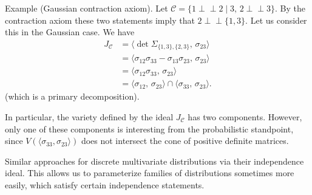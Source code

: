 Example (Gaussian contraction axiom). 
Let \(\mathcal{C} = \{ 1 \perp\!\!\!\perp 2 \mid 3,\, 2 \perp\!\!\!\perp 3 \}\). 
By the contraction axiom these two statements imply that \(2 \perp\!\!\!\perp \{ 1, 3 \}\). 
Let us consider this in the Gaussian case. We have
\[
\begin{aligned}
J_{\mathcal{C}} &= \langle \det \Sigma_{\{1,3\}, \{2,3\}},\, \sigma_{23} \rangle \\
    &= \langle \sigma_{12} \sigma_{33} - \sigma_{13} \sigma_{23},\, \sigma_{23} \rangle \\
    &= \langle \sigma_{12} \sigma_{33},\, \sigma_{23} \rangle \\
    &= \langle \sigma_{12},\, \sigma_{23} \rangle \cap \langle \sigma_{33},\, \sigma_{23} \rangle.
\end{aligned}
\]
(which is a primary decomposition).

In particular, the variety defined by the ideal \(J_{\mathcal{C}}\) has two components. 
However, only one of these components is interesting from the probabilistic standpoint, since
\(V(\langle \sigma_{33}, \sigma_{23} \rangle)\) does not intersect the cone of positive definite matrices.

Similar approaches for discrete multivariate distributions via their independence ideal.
This allows us to parameterize families of distributions sometimes more easily, which satisfy certain independence statements.
